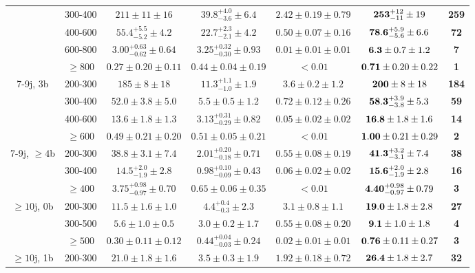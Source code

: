 \begin{table}[!ht]
{\begin{tabular}{c|c||c|c|c|c|c}
 & 300-400 & $211\pm11\pm16$ & $39.8^{+4.0}_{-3.6}\pm6.4$ & $2.42\pm0.19\pm0.79$ & ${\bf 253}^{+12}_{-11}\pm19$ & {\bf 259}\\ 
 & 400-600 & $55.4^{+5.5}_{-5.2}\pm4.2$ & $22.7^{+2.3}_{-2.1}\pm4.2$ & $0.50\pm0.07\pm0.16$ & ${\bf 78.6}^{+5.9}_{-5.6}\pm6.6$ & {\bf 72}\\ 
 & 600-800 & $3.00^{+0.63}_{-0.62}\pm0.64$ & $3.25^{+0.32}_{-0.30}\pm0.93$ & $0.01\pm0.01\pm0.01$ & ${\bf 6.3}\pm0.7\pm1.2$ & {\bf 7}\\ 
 & $\geq800$ & $0.27\pm0.20\pm0.11$ & $0.44\pm0.04\pm0.19$ & $<0.01$ & ${\bf 0.71}\pm0.20\pm0.22$ & {\bf 1}\\ 
\hline
\multirow{4}{*}{7-9j, 3b} & 200-300 & $185\pm8\pm18$ & $11.3^{+1.1}_{-1.0}\pm1.9$ & $3.6\pm0.2\pm1.2$ & ${\bf 200}\pm8\pm18$ & {\bf 184}\\ 
 & 300-400 & $52.0\pm3.8\pm5.0$ & $5.5\pm0.5\pm1.2$ & $0.72\pm0.12\pm0.26$ & ${\bf 58.3}^{+3.9}_{-3.8}\pm5.3$ & {\bf 59}\\ 
 & 400-600 & $13.6\pm1.8\pm1.3$ & $3.13^{+0.31}_{-0.29}\pm0.82$ & $0.05\pm0.02\pm0.02$ & ${\bf 16.8}\pm1.8\pm1.6$ & {\bf 14}\\ 
 & $\geq600$ & $0.49\pm0.21\pm0.20$ & $0.51\pm0.05\pm0.21$ & $<0.01$ & ${\bf 1.00}\pm0.21\pm0.29$ & {\bf 2}\\ 
\hline
\multirow{3}{*}{7-9j, $\geq4$b} & 200-300 & $38.8\pm3.1\pm7.4$ & $2.01^{+0.20}_{-0.18}\pm0.71$ & $0.55\pm0.08\pm0.19$ & ${\bf 41.3}^{+3.2}_{-3.1}\pm7.4$ & {\bf 38}\\ 
 & 300-400 & $14.5^{+2.0}_{-1.9}\pm2.8$ & $0.98^{+0.10}_{-0.09}\pm0.43$ & $0.06\pm0.02\pm0.02$ & ${\bf 15.6}^{+2.0}_{-1.9}\pm2.8$ & {\bf 16}\\ 
 & $\geq400$ & $3.75^{+0.98}_{-0.97}\pm0.70$ & $0.65\pm0.06\pm0.35$ & $<0.01$ & ${\bf 4.40}^{+0.98}_{-0.97}\pm0.79$ & {\bf 3}\\ 
\hline
\multirow{3}{*}{$\geq10$j, 0b} & 200-300 & $11.5\pm1.6\pm1.0$ & $4.4^{+0.4}_{-0.3}\pm2.3$ & $3.1\pm0.8\pm1.1$ & ${\bf 19.0}\pm1.8\pm2.8$ & {\bf 27}\\ 
 & 300-500 & $5.6\pm1.0\pm0.5$ & $3.0\pm0.2\pm1.7$ & $0.55\pm0.08\pm0.20$ & ${\bf 9.1}\pm1.0\pm1.8$ & {\bf 4}\\ 
 & $\geq500$ & $0.30\pm0.11\pm0.12$ & $0.44^{+0.04}_{-0.03}\pm0.24$ & $0.02\pm0.01\pm0.01$ & ${\bf 0.76}\pm0.11\pm0.27$ & {\bf 3}\\ 
\hline
\multirow{3}{*}{$\geq10$j, 1b} & 200-300 & $21.0\pm1.8\pm1.6$ & $3.5\pm0.3\pm1.9$ & $1.92\pm0.18\pm0.72$ & ${\bf 26.4}\pm1.8\pm2.7$ & {\bf 32}\\ 

\end{tabular}}
\end{table}
